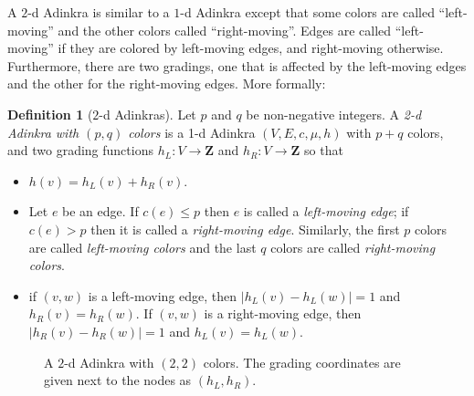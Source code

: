 \documentclass[12pt,twoside,singlespace]{article}
\numberwithin{equation}{section}
\theoremstyle{definition}
\newtheorem{definition}[equation]{Definition}
\newcommand{\ZZ}{\mathbf{Z}}
\begin{document}
A $2$-d Adinkra is similar to a $1$-d Adinkra except that some colors are called ``left-moving'' and the other colors called ``right-moving''.  Edges are called ``left-moving'' if they are colored by left-moving edges, and right-moving otherwise.  Furthermore, there are two gradings, one that is affected by the left-moving edges and the other for the right-moving edges. More formally:
\begin{definition}[$2$-d Adinkras]
Let $p$ and $q$ be non-negative integers. A \emph{2-d Adinkra with $(p,q)$ colors} is a 1-d Adinkra $(V,E,c,\mu,h)$ with $p+q$ colors, and two grading functions $h_L:V\to \ZZ$ and $h_R:V\to \ZZ$ so that
\begin{itemize}
\item $h(v)=h_L(v)+h_R(v)$.
\item Let $e$ be an edge.  If $c(e)\le p$ then $e$ is called a \emph{left-moving edge}; if $c(e)>p$ then it is called a \emph{right-moving edge}. Similarly, the first $p$ colors are called \emph{left-moving colors} and the last $q$ colors are called \emph{right-moving colors}.
\item if $(v,w)$ is a left-moving edge, then $|h_L(v)-h_L(w)|=1$ and $h_R(v)=h_R(w)$.  If $(v,w)$ is a right-moving edge, then $|h_R(v)-h_R(w)|=1$ and $h_L(v)=h_L(w)$.
\end{itemize}
\end{definition}

\begin{figure}[htb]
\begin{center}
\caption{A $2$-d Adinkra with $(2,2)$ colors. The grading coordinates are given next to the nodes as $(h_L, h_R)$. \label{fig:2d-example}}
\end{center}
\end{figure}
\end{document}
